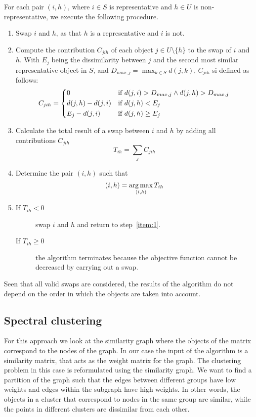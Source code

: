 For each pair $(i,h)$, where $i \in S$ is representative and $h \in U$ is non-representative, we execute the following procedure.
\begin{enumerate}
    \item Swap $i$ and $h$, as that $h$ is a representative and $i$ is not.\label{item:1}
    \item Compute the contribution $C_{jih}$ of each object $j \in U\setminus \{h\}$ to the swap of $i$ and $h$. With $E_j$ being the dissimilarity between $j$ and the second most similar representative object in $S$, and $D_{max,j} = \max_{k\in S}{d(j,k)}$, $C_{jih}$ si defined as follows:
    \begin{equation*}
        C_{jih}=
        \begin{dcases}
            0 & \text{if } d(j,i)> D_{max,j}\land d(j,h)> D_{max,j}\\
            d(j,h)-d(j,i) & \text{if } d(j,h)<E_j  \\
            E_j-d(j,i) & \text{if } d(j,h)\geq E_j \\
        \end{dcases}
    \end{equation*}  
    \item Calculate the total result of a swap between $i$ and $h$ by adding all contributions $C_{jih}$
    \begin{equation*}
        T_{ih}=\sum_j{C_{jih}}
    \end{equation*}
    \item Determine the pair $(i,h)$ such that
    \begin{equation*}
        (i,h)=\operatorname*{arg\,max}_{(i,h)}{T_{ih}}
    \end{equation*}
    \item 
    \begin{description}
        \item[If \boldmath$T_{ih}<0$] swap $i$ and $h$ and return to step~\ref{item:1}.
        \item[If \boldmath$T_{ih}\geq 0$] the algorithm terminates because the objective function cannot be decreased by carrying out a swap.
    \end{description}
\end{enumerate}
Seen that all valid swaps are considered, the results of the algorithm do not depend on the order in which the objects are taken into account.

\subsection{Spectral clustering}\label{clustering_spectral}
For this approach we look at the similarity graph where the objects of the matrix correspond to the nodes of the graph. In our case the input of the algorithm is a similarity matrix, that acts as the weight matrix for the graph. The clustering problem in this case is reformulated using the similarity graph. We want to find a partition of the graph such that the edges between different groups have low weights and edges within the subgraph have high weights. In other words, the objects in a cluster that correspond to nodes in the same group are similar, while the points in different clusters are dissimilar from each other.

